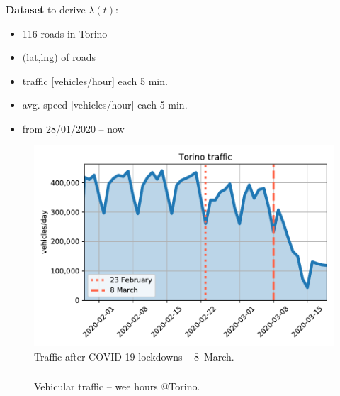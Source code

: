 \documentclass[aspectratio=169]{beamer}
\begin{document}
\begin{frame}
    \frametitle{\secname}
    \framesubtitle{\subsecname}

    \begin{minipage}{0.37\textwidth}
        \textbf{Dataset} to derive $\lambda(t)$:
        \begin{itemize}
            \item 116 roads in Torino
            \item (lat,lng) of roads
            \item traffic [vehicles/hour] each 5 min.
            \item avg. speed [vehicles/hour] each 5 min.
            \item from 28/01/2020 -- now
        \end{itemize}
    \end{minipage}
    \hfill
    \begin{minipage}{0.6\textwidth}
        \begin{figure}
            \centering
            \includegraphics[width=.9\textwidth]{img/traffic-drop.pdf}
            \caption{Traffic after COVID-19 lockdowns -- 8~March.}
        \end{figure}
    \end{minipage}
\end{frame}





\begin{frame}
    \frametitle{\secname}
    \framesubtitle{\subsecname}

    \begin{figure}
        \caption{Vehicular traffic -- wee hours @Torino.}
    \end{figure}
\end{frame}
\end{document}
